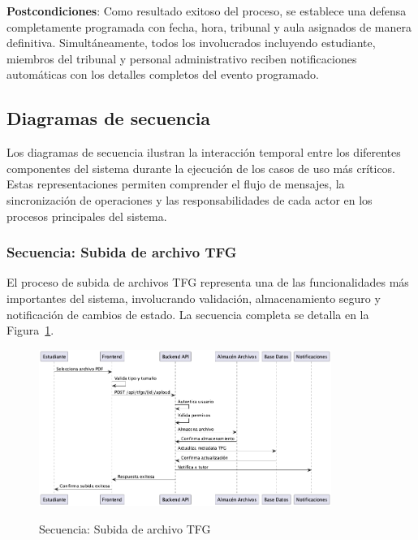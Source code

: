 \documentclass[12pt,a4paper,oneside]{report}
\providecommand{\pandocbounded}[1]{#1}
\begin{document}
\textbf{Postcondiciones}: Como resultado exitoso del proceso, se establece una defensa completamente programada con fecha, hora, tribunal y aula asignados de manera definitiva. Simultáneamente, todos los involucrados incluyendo estudiante, miembros del tribunal y personal administrativo reciben notificaciones automáticas con los detalles completos del evento programado.

\subsection{Diagramas de secuencia}\label{diagramas-de-secuencia}

Los diagramas de secuencia ilustran la interacción temporal entre los diferentes componentes del sistema durante la ejecución de los casos de uso más críticos. Estas representaciones permiten comprender el flujo de mensajes, la sincronización de operaciones y las responsabilidades de cada actor en los procesos principales del sistema.

\subsubsection{Secuencia: Subida de archivo
TFG}\label{secuencia-subida-de-archivo-tfg}

El proceso de subida de archivos TFG representa una de las funcionalidades más importantes del sistema, involucrando validación, almacenamiento seguro y notificación de cambios de estado. La secuencia completa se detalla en la Figura~\ref{fig:secuencia-subida-archivo}.

\begin{figure}[H]
\centering
\pandocbounded{\includegraphics[keepaspectratio,width=0.85\textwidth,alt={Secuencia: Subida de archivo TFG}]{processed/images/04_analisis_sistema_plantuml_1.png}}
\caption{Secuencia: Subida de archivo TFG}
\label{fig:secuencia-subida-archivo}
\end{figure}
\end{document}
